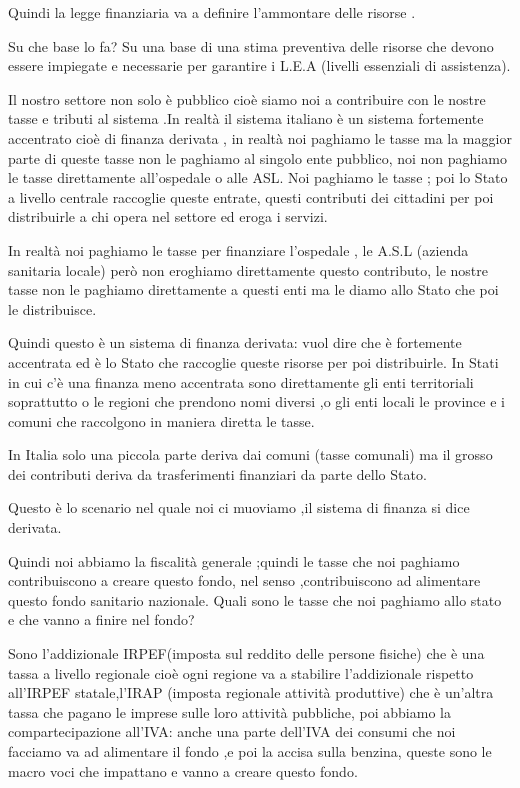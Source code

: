 Quindi la legge finanziaria va a definire l'ammontare delle risorse .

Su che base lo fa? Su una base di una stima preventiva delle risorse che
devono essere impiegate e necessarie per garantire i L.E.A (livelli
essenziali di assistenza).

Il nostro settore non solo è pubblico cioè siamo noi a contribuire con
le nostre tasse e tributi al sistema .In realtà il sistema italiano è un
sistema fortemente accentrato cioè di finanza derivata , in realtà noi
paghiamo le tasse ma la maggior parte di queste tasse non le paghiamo al
singolo ente pubblico, noi non paghiamo le tasse direttamente
all'ospedale o alle ASL. Noi paghiamo le tasse ; poi lo Stato a livello
centrale raccoglie queste entrate, questi contributi dei cittadini per
poi distribuirle a chi opera nel settore ed eroga i servizi.

In realtà noi paghiamo le tasse per finanziare l'ospedale , le A.S.L
(azienda sanitaria locale) però non eroghiamo direttamente questo
contributo, le nostre tasse non le paghiamo direttamente a questi enti
ma le diamo allo Stato che poi le distribuisce.

Quindi questo è un sistema di finanza derivata: vuol dire che è
fortemente accentrata ed è lo Stato che raccoglie queste risorse per poi
distribuirle. In Stati in cui c'è una finanza meno accentrata sono
direttamente gli enti territoriali soprattutto o le regioni che prendono
nomi diversi ,o gli enti locali le province e i comuni che raccolgono in
maniera diretta le tasse.

In Italia solo una piccola parte deriva dai comuni (tasse comunali) ma
il grosso dei contributi deriva da trasferimenti finanziari da parte
dello Stato.

Questo è lo scenario nel quale noi ci muoviamo ,il sistema di finanza si
dice derivata.

Quindi noi abbiamo la fiscalità generale ;quindi le tasse che noi
paghiamo contribuiscono a creare questo fondo, nel senso ,contribuiscono
ad alimentare questo fondo sanitario nazionale. Quali sono le tasse che
noi paghiamo allo stato e che vanno a finire nel fondo?

Sono l'addizionale IRPEF(imposta sul reddito delle persone fisiche) che
è una tassa a livello regionale cioè ogni regione va a stabilire
l'addizionale rispetto all'IRPEF statale,l'IRAP (imposta regionale
attività produttive) che è un'altra tassa che pagano le imprese sulle
loro attività pubbliche, poi abbiamo la compartecipazione all'IVA: anche
una parte dell'IVA dei consumi che noi facciamo va ad alimentare il
fondo ,e poi la accisa sulla benzina, queste sono le macro voci che
impattano e vanno a creare questo fondo.

